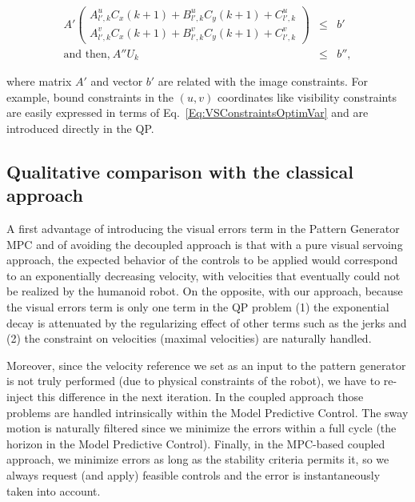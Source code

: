\begin{eqnarray}
  A'
 \left(
 \begin{matrix}
  A^u_{l',k} C_x(k+1) +  B^u_{l',k} C_y(k+1) +  C^u_{l',k} \\
  A^v_{l',k} C_x(k+1) +  B^v_{l',k} C_y(k+1) +  C^v_{l',k}
 \end{matrix}
 \right) &\leq&  b'
 \label{Eq:VSConstraintsOptimVar}\\
\nonumber
\text{and then,} ~  A'' U_k &\leq&  b'',
\end{eqnarray}

\noindent where matrix $ A'$ and vector $ b'$ are related with the image constraints. For example, bound constraints in the $(u,v)$ coordinates like visibility constraints are easily expressed in terms of Eq.~\ref{Eq:VSConstraintsOptimVar} and are introduced directly in the QP.


\subsection{Qualitative comparison with the classical approach}

\label{subsection:qualdiscussion}

A first advantage of introducing the visual errors term in the Pattern Generator MPC and of avoiding the decoupled approach is that with a pure visual servoing approach, the expected behavior of the controls to be applied would correspond to an exponentially decreasing velocity, with velocities that eventually could not be realized by the humanoid robot. On the opposite, with our approach, because the visual errors term is only one term in the QP problem (1) the exponential decay is attenuated by the regularizing effect of other terms such as the jerks and (2) the constraint on velocities (maximal velocities) are naturally handled.   

Moreover, since the velocity reference we set as an input to the pattern generator is not truly performed (due to physical constraints of the robot), we have to re-inject this difference in the next iteration. In the coupled approach those problems are handled intrinsically within the Model Predictive Control. The sway motion is naturally filtered since we minimize the errors within a full cycle (the horizon in the Model Predictive Control). Finally, in the MPC-based coupled approach, we minimize errors as long as the stability criteria permits it, so we always request (and apply) feasible controls and the error is instantaneously taken into account.

